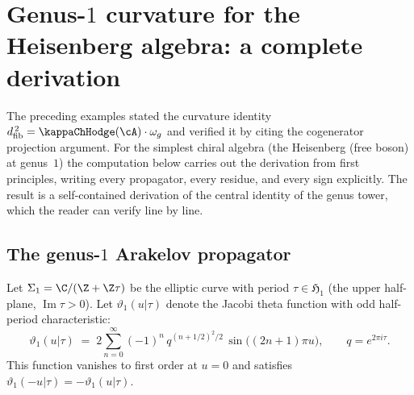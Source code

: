 \section{Genus-$1$ curvature for the Heisenberg algebra: a complete derivation}
\label{sec:heisenberg-genus-1-complete}

\providecommand{\dfib}{d_{\mathrm{fib}}}
\providecommand{\Dg}[1]{D_{#1}}
\providecommand{\Res}{\operatorname{Res}}

The preceding examples stated the curvature identity
$\dfib^{\,2} = \kappaChHodge(\cA) \cdot \omega_g$ and verified it
by citing the cogenerator projection argument. For the simplest
chiral algebra (the Heisenberg (free boson) at genus~$1$)
the computation below carries out the derivation from first principles, writing
every propagator, every residue, and every sign explicitly. The
result is a self-contained derivation of the central identity of
the genus tower, which the reader can verify line by line.

\subsection{The genus-$1$ Arakelov propagator}
\label{subsec:arakelov-genus-1-explicit}

Let $\Sigma_1 = \C / (\Z + \Z\tau)$ be the elliptic curve with
period $\tau \in \mathfrak{H}_1$ (the upper half-plane,
$\operatorname{Im}\tau > 0$). Let $\vartheta_1(u|\tau)$ denote
the Jacobi theta function with odd half-period characteristic:
\begin{equation}\label{eq:jacobi-theta-1-def}
 \vartheta_1(u|\tau)
 \;=\;
 2\sum_{n=0}^\infty (-1)^n\, q^{(n+1/2)^2/2}\,
 \sin\bigl((2n+1)\pi u\bigr),
 \qquad
 q = e^{2\pi i \tau}.
\end{equation}
This function vanishes to first order at $u = 0$ and satisfies
$\vartheta_1(-u|\tau) = -\vartheta_1(u|\tau)$.

